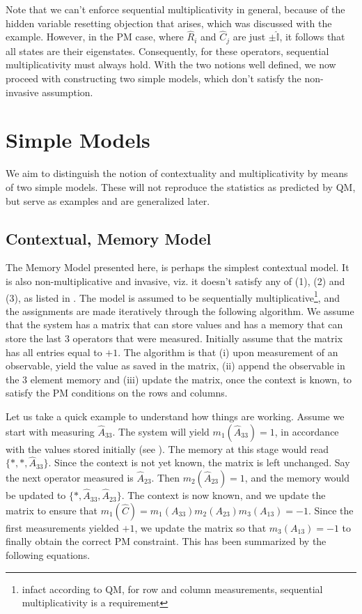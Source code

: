 Note that we can't enforce sequential multiplicativity in general,
because of the hidden variable resetting objection that arises, which
was discussed with the example. However, in the PM case, where $\hat{R}_{i}$
and $\hat{C}_{j}$ are just $\pm\hat{\mathbb{I}}$, it follows that
all states are their eigenstates. Consequently, for these operators,
sequential multiplicativity must always hold. With the two notions
well defined, we now proceed with constructing two simple models,
which don't satisfy the non-invasive assumption.


\section{Simple Models}

We aim to distinguish the notion of contextuality and multiplicativity
by means of two simple models. These will not reproduce the statistics
as predicted by QM, but serve as examples and are generalized later.


\subsection{Contextual, Memory Model\label{sub:Contextual,-Memory-Model}}

The Memory Model presented here, is perhaps the simplest contextual
model. It is also non-multiplicative and invasive, viz. it doesn't
satisfy any of (1), (2) and (3), as listed in .
The model is assumed to be sequentially multiplicative\footnote{infact according to QM, for row and column measurements, sequential
multiplicativity is a requirement}, and the assignments are made iteratively through the following algorithm.
We assume that the system has a matrix that can store values and has
a memory that can store the last 3 operators that were measured. Initially
assume that the matrix has all entries equal to $+1$. The algorithm
is that (i) upon measurement of an observable, yield the value as
saved in the matrix, (ii) append the observable in the 3 element memory
and (iii) update the matrix, once the context is known, to satisfy
the PM conditions on the rows and columns. 

Let us take a quick example to understand how things are working.
Assume we start with measuring $\hat{A}_{33}$. The system will yield
$m_{1}(\hat{A}_{33})=1$, in accordance with the values stored initially
(see ). The memory at this stage
would read $\{*,*,\hat{A}_{33}\}$. Since the context is not yet known,
the matrix is left unchanged. Say the next operator measured is $\hat{A}_{23}$.
Then $m_{2}(\hat{A}_{23})=1$, and the memory would be updated to
$\{*,\hat{A}_{33},\hat{A}_{23}\}$. The context is now known, and
we update the matrix to ensure that $m_{1}(\hat{C})=m_{1}(A_{33})m_{2}(A_{23})m_{3}(A_{13})=-1$.
Since the first measurements yielded $+1$, we update the matrix so
that $m_{3}(A_{13})=-1$ to finally obtain the correct PM constraint.
This has been summarized by the following equations.

